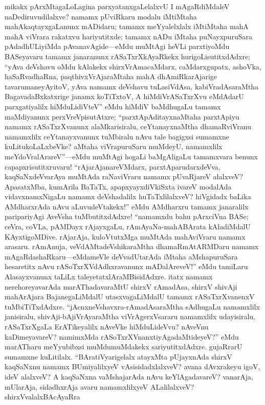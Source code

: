 \documentclass[11pt,a4size]{article}
\begin{document}
mikakx pArxMtagaLoLagina parxyatanxgaLelalxvU I mAgaRdiMdaleV
naDediruvudilalxve? namamx pUviRkaru modalu iMtiMtaha
mahAkaqtayxgaLanunx mADidaru; tamamx meYyalelxlalx iMtiMtaha mahA mahA
viVrara rakatxvu hariyutitxde; tamamx nADu iMtaha puNayxpuruSara
pAdadhULiyiMda pAvanavAgide---eMdu muMtAgi heVLi parxtiyoMdu
BASeyavaru tamamx janaranunx rASaTxrXkAyaRkekx hurigoLisutitxdAdxre;
``yAva deVshavu oMdu kAlakekx shirxVrAmacaMdarx, caMdarxgupatx,
ashoVka, haSaRvadhaRna, paqthivxVrAjaraMtaha mahA dhAmiRkarAjarige
tavarumaneyAyitoV, yAva namamx deVshavu tuLasiVdAsa, kabiVradAsaraMtha
BagavadaBxkatxrige janamx koTiTxtoV, A hiMdiVrASaTxrXvu eMdAdarU
parxgatiyalilx hiMduLidiVteV'' eMdu hiMdiV baMdhugaLu tamamx
maMdiyanunx perxVreVpisutAtxre; ``parxtApAditayxnaMtaha parxtApiyu
namamx rASaTxrXvanunx alaMkarisiralu, ceYtanayxnaMtha dhamaRviVranu
namamxlilx ceYtanayxvanunx tuMbiralu nAvu tale bagigxsi sumamxne
kuLitukoLaLxbeVke? aMtaha viVrapuruSaru muMdeyU, namamxlilx
meYdoVralArareV''---eMdu muMtAgi hogaLi baMgAligaLu tamamxvara benunx
capapxrisutitxruvaru! ``rAjarAjanareVMdarx, parxtAparudarxdeVva,
kaqSaNxdeVvarAya muMtAda raNaviVraru namamx pUvaRjareV alalxveV?
ApasatxMba, kumArila BaTaTx, apapxyayxdiVkiSxta ivareV modalAda
vidavxnamxNigaLu namamx deVshadalilx huTaTxlilalxveV? hiVgidadx
baLika AMdharxrAda nAvu aLuvudeVtakekx!'' eMdu AMdharxru tamamx
janaralilx paripariyAgi AveVsha tuMbutitxdAdxre! ``namamxdu bahu
pArxciVna BASe; ceVra, coVLa, pAMDayx rAjayxgaLu, rAmAyaNa-mahABArata
kAladiMdalU KAyxtigoMDive. rAjarAja, kuloVtutxMga muMtAda mahAviVraru
namamx arasaru. rAmAnuja, veVdAMtadeVshikaraMtha dhamaRmAtARMDaru
namamx mAgaRdashaRkaru---eMdameVle deVvadUtarAda iMtaha aMshapuruSara
hesaretitx nAvu rASoTxrXVdAdhxravanunx mADalAreveV!'' eMdu tamiLaru
Alasayxvanunx taLiLx taleyetatxlAraMBisidAdxre. itatx namamx
nerehoreyavarAda marAThadavaraMtU shirxV rAmadAsa, shirxV shivAji
mahArAjara BajanegaLiMdalU utasxvagaLiMdalU tamamx rASaTxrXvanenxV
tuMbiTiTxdAdxre. ``jAcnxneVshavxra-rAmadAsaraMtha sAdhugaLu
namamxlilx janisiralu, shivAji-bAjiVrAyaraMtha viVrAgerxVsararu
namamxlilx udayisiralu, rASaTxrXgaLa ErATikeyalilx nAveVke
hiMduLideVvu? nAveVnu kaDimeyavareV? namimxMda
rASoTxrXVnanxtiyAgadaMtideyeV?'' eMdu marATharu meYyubibxsi
muMdumuMdakekx sariyutitxdAdxre. gujaRrarU sumamxne kuLitilalx. 
``BAratiVyarigelalx atayxMta pUjayxnAda shirxV kaqSaNxnu namamx
BUmiyalilxyeV vAsisidadxlalxveV? avana dAvxrakeyu igoV, ideV alalxveV? 
A kaqSaNxna vaMshajarAda nAvu keYlAgadavareV? vanarAja, mUlarAja,
sidadhxrAja avaru namamxlilxyeV ALalilalxveV? shirxVvalalxBAcAyaRra
\end{document}
